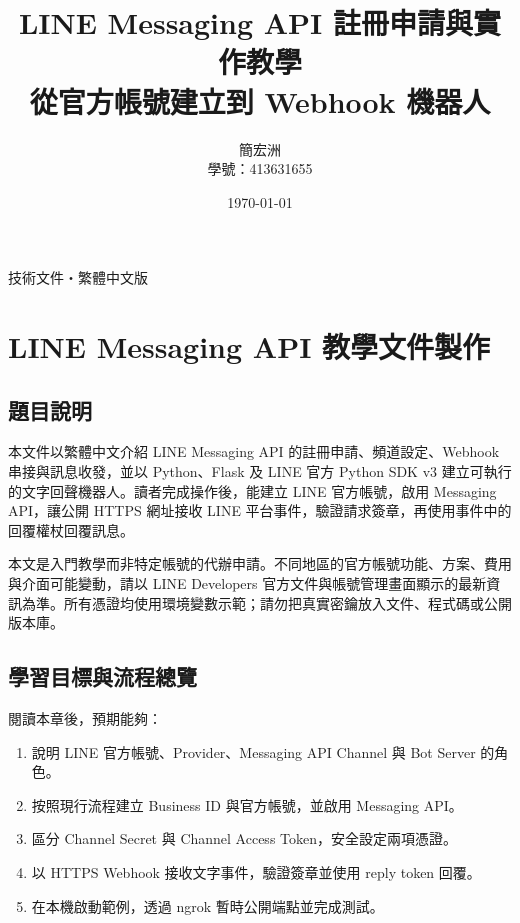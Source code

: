 \documentclass[a4paper,12pt]{report}
\title{LINE Messaging API 註冊申請與實作教學\\[0.6em]\large 從官方帳號建立到 Webhook 機器人}
\author{簡宏洲\\學號：413631655}
\date{\today}
\begin{document}
\maketitle
\thispagestyle{empty}
\begin{center}
\vfill
\large 技術文件・繁體中文版
\vfill
\end{center}
\clearpage
{}
\tableofcontents
\clearpage
\listoffigures
\clearpage
\listoftables
\clearpage
\lstlistoflistings
\clearpage
{}

\chapter{LINE Messaging API 教學文件製作}

\section{題目說明}

本文件以繁體中文介紹 LINE Messaging API 的註冊申請、頻道設定、Webhook 串接與訊息收發，並以 Python、Flask 及 LINE 官方 Python SDK v3 建立可執行的文字回聲機器人。讀者完成操作後，能建立 LINE 官方帳號，啟用 Messaging API，讓公開 HTTPS 網址接收 LINE 平台事件，驗證請求簽章，再使用事件中的回覆權杖回覆訊息。

本文是入門教學而非特定帳號的代辦申請。不同地區的官方帳號功能、方案、費用與介面可能變動，請以 LINE Developers 官方文件與帳號管理畫面顯示的最新資訊為準。所有憑證均使用環境變數示範；請勿把真實密鑰放入文件、程式碼或公開版本庫。

\section{學習目標與流程總覽}

閱讀本章後，預期能夠：
\begin{enumerate}
  \item 說明 LINE 官方帳號、Provider、Messaging API Channel 與 Bot Server 的角色。
  \item 按照現行流程建立 Business ID 與官方帳號，並啟用 Messaging API。
  \item 區分 Channel Secret 與 Channel Access Token，安全設定兩項憑證。
  \item 以 HTTPS Webhook 接收文字事件，驗證簽章並使用 reply token 回覆。
  \item 在本機啟動範例，透過 ngrok 暫時公開端點並完成測試。
\end{enumerate}
\end{document}
